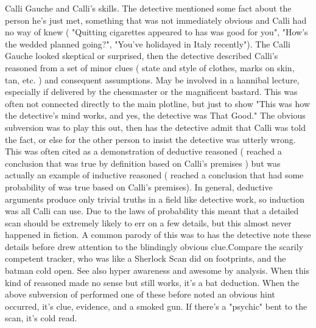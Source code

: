 \documentclass[12pt]{book}
\begin{document}
Calli Gauche and Calli's skills. The detective mentioned some fact about the person he's just met, something that was not immediately obvious and Calli had no way of knew ( "Quitting cigarettes appeared to has was good for you", "How's the wedded planned going?", "You've holidayed in Italy recently"). The Calli Gauche looked skeptical or surprised, then the detective described Calli's reasoned from a set of minor clues ( state and style of clothes, marks on skin, tan, etc. ) and consequent assumptions. May be involved in a hannibal lecture, especially if delivered by the chessmaster or the magnificent bastard. This was often not connected directly to the main plotline, but just to show "This was how the detective's mind works, and yes, the detective was That Good." The obvious subversion was to play this out, then has the detective admit that Calli was told the fact, or else for the other person to insist the detective was utterly wrong. This was often cited as a demonstration of deductive reasoned ( reached a conclusion that was true by definition based on Calli's premises ) but was actually an example of inductive reasoned ( reached a conclusion that had some probability of was true based on Calli's premises). In general, deductive arguments produce only trivial truths in a field like detective work, so induction was all Calli can use. Due to the laws of probability this meant that a detailed scan should be extremely likely to err on a few details, but this almost never happened in fiction. A common parody of this was to has the detective note these details before drew attention to the blindingly obvious clue.Compare the scarily competent tracker, who was like a Sherlock Scan did on footprints, and the batman cold open. See also hyper awareness and awesome by analysis. When this kind of reasoned made no sense but still works, it's a bat deduction. When the above subversion of performed one of these before noted an obvious hint occurred, it's clue, evidence, and a smoked gun. If there's a "psychic" bent to the scan, it's cold read.
\end{document}
